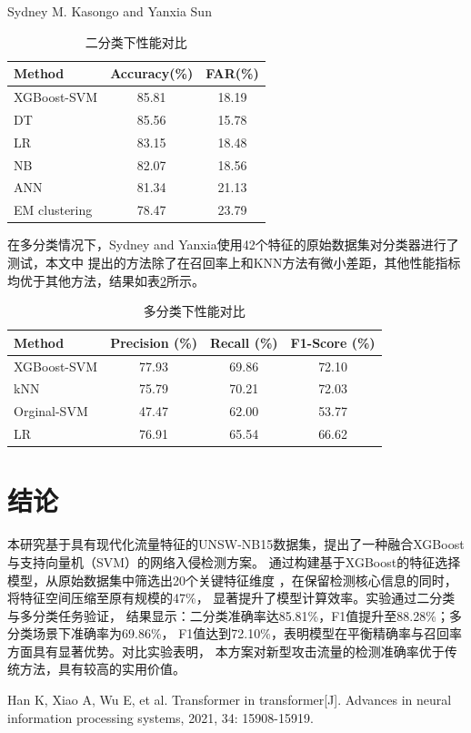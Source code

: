 \documentclass{article}
\begin{document}
Sydney M. Kasongo  and Yanxia Sun
\begin{table}[H]
  \caption{二分类下性能对比}
  \label{table:compare1}
  \centering
  \begin{tabular}{lcc}
    \toprule
      Method        & Accuracy(\%)  & FAR(\%) \\ \midrule
    XGBoost-SVM     & 85.81    & 18.19  \\    
    DT     & 85.56   & 15.78  \\    
    LR     & 83.15   & 18.48  \\    
    NB     & 82.07   & 18.56  \\   
    ANN     & 81.34   & 21.13  \\      
    EM clustering    & 78.47   & 23.79   \\\bottomrule 
  \end{tabular}
\end{table}
在多分类情况下，Sydney and Yanxia使用42个特征的原始数据集对分类器进行了测试，本文中
提出的方法除了在召回率上和KNN方法有微小差距，其他性能指标均优于其他方法，结果如表\ref{table:compare2}所示。
\begin{table}[H]
  \caption{多分类下性能对比}
  \label{table:compare2}
  \centering
  \begin{tabular}{lccc}
    \toprule
      Method & Precision (\%) & Recall (\%) & F1-Score (\%) \\ \midrule
      XGBoost-SVM & 77.93 & 69.86 & 72.10 \\
      kNN & 75.79 & 70.21 & 72.03 \\
      Orginal-SVM & 47.47 & 62.00 & 53.77 \\
      LR & 76.91 & 65.54 & 66.62 \\ \bottomrule 
  \end{tabular}
\end{table}

\section{结论}
本研究基于具有现代化流量特征的UNSW-NB15数据集，提出了一种融合XGBoost与支持向量机（SVM）的网络入侵检测方案。
通过构建基于XGBoost的特征选择模型，从原始数据集中筛选出20个关键特征维度
，在保留检测核心信息的同时，将特征空间压缩至原有规模的47\%，
显著提升了模型计算效率。实验通过二分类与多分类任务验证，
结果显示：二分类准确率达85.81\%，F1值提升至88.28\%；多分类场景下准确率为69.86\%，
F1值达到72.10\%，表明模型在平衡精确率与召回率方面具有显著优势。对比实验表明，
本方案对新型攻击流量的检测准确率优于传统方法，具有较高的实用价值。
\begin{thebibliography}{10}

Han K, Xiao A, Wu E, et al. Transformer in transformer[J]. Advances in neural information processing systems, 2021, 34: 15908-15919.
\end{thebibliography}
\end{document}

